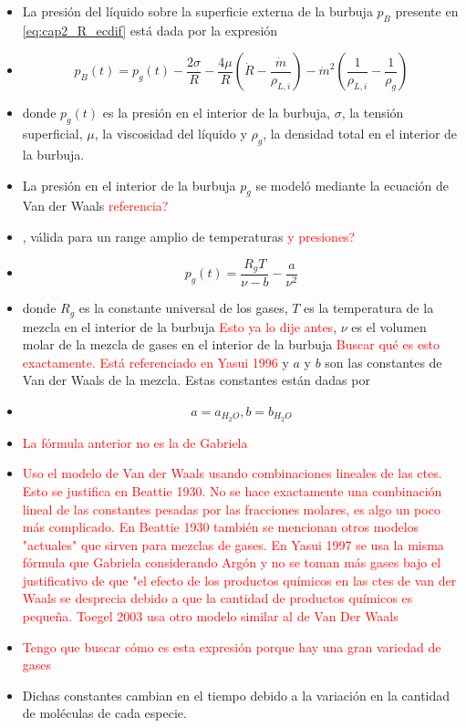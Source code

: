 \documentclass[aps,prb,onecolumn,superscriptaddress,floatfix,longbibliography,10pt]{revtex4-2}
\newif\ifptitle
\newif\ifpnumber
\newcounter{para}
\newcommand\ptitle[1]{\par\refstepcounter{para}
{\ifpnumber{\noindent\textcolor{lightgray}{\textbf{\thepara}}\indent}\fi}
{\ifptitle{\textbf{[{#1}]}}\fi}}
\begin{document}
\ptitle{Definición de $p_B$ presión del líquido sobre la superficie externa de la burbuja}
\begin{itemize}
  \item La presión del líquido sobre la superficie externa de la burbuja $p_B$ presente en \ref{eq:cap2_R_ecdif} está dada por la expresión
  \item \[p_B(t) = p_g(t) -\frac{2 \sigma}{R} - \frac{4 \mu}{R} \left ( \dot{R} - \frac{\dot{m}}{\rho_{L,i}} \right ) - \dot{m}^2 \left ( \frac{1}{\rho_{L,i}} - \frac{1}{\rho_g} \right ) \]
  \item donde $p_g(t)$ es la presión en el interior de la burbuja, $\sigma$, la tensión superficial, $\mu$, la viscosidad del líquido y $\rho_g$, la densidad total en el interior de la burbuja.
\end{itemize}

\ptitle{Definición de la presión en el interior de la burbuja $p_g$. Ec de estado de Van der Waals.}
\begin{itemize}
  \item La presión en el interior de la burbuja $p_g$ se modeló mediante la ecuación de Van der Waals \textcolor{red}{referencia?}
  \item , válida para un range amplio de temperaturas \textcolor{red}{y presiones?}
  \item \[p_g(t) = \frac{R_g T}{\nu - b} - \frac{a}{\nu^2}\]
  \item donde $R_g$ es la constante universal de los gases, $T$ es la temperatura de la mezcla en el interior de la burbuja \textcolor{red}{Esto ya lo dije antes}, $\nu$ es el volumen molar de la mezcla de gases en el interior de la burbuja \textcolor{red}{Buscar qué es esto exactamente. Está referenciado en Yasui 1996} y $a$ y $b$ son las constantes de Van der Waals de la mezcla. Estas constantes están dadas por
  \item \[a = a_{H_2O}, b = b_{H_2O} \]
  \item \textcolor{red}{La fórmula anterior no es la de Gabriela}
  \item \textcolor{red}{Uso el modelo de Van der Waals usando combinaciones lineales de las ctes. Esto se justifica en Beattie 1930. No se hace exactamente una combinación lineal de las constantes pesadas por las fracciones molares, es algo un poco más complicado. En Beattie 1930 también se mencionan otros modelos "actuales" que sirven para mezclas de gases. En Yasui 1997 se usa la misma fórmula que Gabriela considerando Argón y no se toman más gases bajo el justificativo de que "el efecto de los productos químicos en las ctes de van der Waals se desprecia debido a que la cantidad de productos químicos es pequeña. Toegel 2003 usa otro modelo similar al de Van Der Waals}
  \item \textcolor{red}{Tengo que buscar cómo es esta expresión porque hay una gran variedad de gases}
  \item Dichas constantes cambian en el tiempo debido a la variación en la cantidad de moléculas de cada especie.
\end{itemize}
\end{document}
